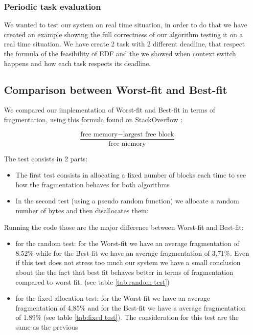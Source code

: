 \subsubsection{Periodic task evaluation}
We wanted to test our system on real time situation, in order to do that we have created an example showing the full correctness of our algorithm testing it on a real time situation. We have create 2 task with 2 different deadline, that respect the formula of the feasibility of EDF and the we showed when context switch happens and how each task respects its deadline.



\subsection{Comparison between Worst-fit and Best-fit}
We compared our implementation of Worst-fit and Best-fit in terms of fragmentation, using this formula found on StackOverflow :

\[\frac{{\text{{free memory}} - \text{{largest free block}}}}{{\text{{free memory}}}} \]

The test consists in 2 parts:
\begin{itemize}
    \item The first test consists in allocating a fixed number of blocks each time to see how the fragmentation behaves for both algorithms
    \item In the second test (using a pseudo random function) we allocate a random number of bytes and then disallocates them:
\end{itemize}

Running the code those are the major difference between Worst-fit and Best-fit:
\begin{itemize}
    \item for the random test: for the Worst-fit we have an average fragmentation of 8.52\% while for the Best-fit we have an average fragmentation of  3,71\%. Even if this test does not stress too much our system we have a small conclusion about the the fact that best fit behaves better in terms of fragmentation compared to worst fit. (see table \ref{tab:random test})
    \item for the fixed allocation test: for the Worst-fit we have an average fragmentation of 4,85\% and for the Best-fit we have a average fragmentation of 1.89\%   (see table \ref{tab:fixed test}). The consideration for this test are the same as the previous
\end{itemize}

